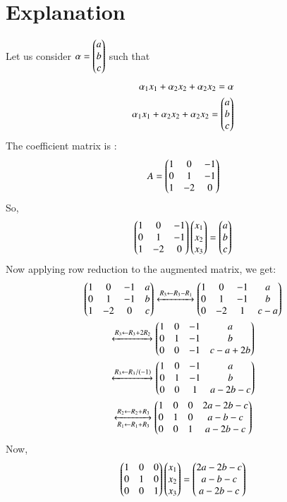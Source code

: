 \documentclass[journal,12pt,twocolumn]{IEEEtran}
\begin{document}
\section{Explanation}
Let us consider $\alpha = \begin{pmatrix}a\\b\\c\end{pmatrix}$ such that
\begin{align}
\alpha_1 x_1 + \alpha_2 x_2 + \alpha_2 x_2 = \alpha\\
\alpha_1 x_1 + \alpha_2 x_2 + \alpha_2 x_2 = \begin{pmatrix}a\\b\\c\end{pmatrix}
\end{align}
The coefficient matrix is :
\begin{align}
A = \begin{pmatrix}1 & 0 & -1\\0 & 1 & -1\\1 & -2 & 0\end{pmatrix}
\end{align}
So,
\begin{align}
\begin{pmatrix}1 & 0 & -1\\0 & 1 & -1\\1 & -2 & 0\end{pmatrix}\begin{pmatrix}x_1\\x_2\\x_3\end{pmatrix} = \begin{pmatrix}a\\b\\c\end{pmatrix}
\end{align}
Now applying row reduction to the augmented matrix, we get:
\begin{multline}
\begin{pmatrix}1 & 0 & -1 & a\\0 & 1 & -1 & b\\1 & -2 & 0 & c\end{pmatrix}\xleftrightarrow[]{R_3\leftarrow R_3-R_1}\begin{pmatrix}1 & 0 & -1 & a\\0 & 1 & -1 & b\\0 & -2 & 1 & c-a\end{pmatrix}\\
\xleftrightarrow[]{R_3\leftarrow R_3+2R_2}\begin{pmatrix}1 & 0 & -1 & a\\0 & 1 & -1 & b\\0 & 0 & -1 & c-a+2b\end{pmatrix}\\
\xleftrightarrow[]{R_3\leftarrow R_3/(-1)}\begin{pmatrix}1 & 0 & -1 & a\\0 & 1 & -1 & b\\0 & 0 & 1 & a-2b-c\end{pmatrix}\\
\xleftrightarrow[R_1\leftarrow R_1+R_3]{R_2\leftarrow R_2+R_3}\begin{pmatrix}1 & 0 & 0 & 2a-2b-c\\0 & 1 & 0 & a-b-c\\0 & 0 & 1 & a-2b-c\end{pmatrix}
\end{multline}
Now,
\begin{align}
\begin{pmatrix}1 & 0 & 0\\0 & 1 & 0\\0 & 0 & 1\end{pmatrix}\begin{pmatrix}x_1\\x_2\\x_3\end{pmatrix} = \begin{pmatrix}2a-2b-c\\a-b-c\\a-2b-c\end{pmatrix}
\end{align}
\end{document}
